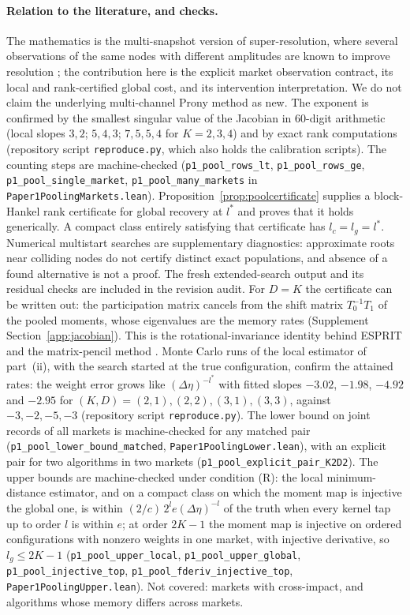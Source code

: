 \documentclass[12pt]{article}
\theoremstyle{definition}
\theoremstyle{remark}
\begin{document}
\paragraph{Relation to the literature, and checks.} The mathematics is the multi-snapshot version of super-resolution, where several observations of the same nodes with different amplitudes are known to improve resolution \citep{li2022}; the contribution here is the explicit market observation contract, its local and rank-certified global cost, and its intervention interpretation. We do not claim the underlying multi-channel Prony method as new. The exponent is confirmed by the smallest singular value of the Jacobian in 60-digit arithmetic (local slopes $3,2$; $5,4,3$; $7,5,5,4$ for $K=2,3,4$) and by exact rank computations (repository script \nolinkurl{reproduce.py}, which also holds the calibration scripts). The counting steps are machine-checked (\texttt{p1\_pool\_rows\_lt}, \texttt{p1\_pool\_rows\_ge}, \texttt{p1\_pool\_single\_market}, \texttt{p1\_pool\_many\_markets} in \nolinkurl{Paper1PoolingMarkets.lean}). Proposition~\ref{prop:poolcertificate} supplies a block-Hankel rank certificate for global recovery at $l^*$ and proves that it holds generically. A compact class entirely satisfying that certificate has $l_c=l_g=l^*$. Numerical multistart searches are supplementary diagnostics: approximate roots near colliding nodes do not certify distinct exact populations, and absence of a found alternative is not a proof. The fresh extended-search output and its residual checks are included in the revision audit. For $D=K$ the certificate can be written out: the participation matrix cancels from the shift matrix $T_0^{-1}T_1$ of the pooled moments, whose eigenvalues are the memory rates (Supplement Section~\ref{app:jacobian}). This is the rotational-invariance identity behind ESPRIT and the matrix-pencil method \citep{roy1989,huasarkar1990}. Monte Carlo runs of the local estimator of part~(ii), with the search started at the true configuration, confirm the attained rates: the weight error grows like $(\Delta\eta)^{-l^*}$ with fitted slopes $-3.02$, $-1.98$, $-4.92$ and $-2.95$ for $(K,D)=(2,1),(2,2),(3,1),(3,3)$, against $-3,-2,-5,-3$ (repository script \nolinkurl{reproduce.py}). The lower bound on joint records of all markets is machine-checked for any matched pair (\texttt{p1\_pool\_lower\_bound\_matched}, \nolinkurl{Paper1PoolingLower.lean}), with an explicit pair for two algorithms in two markets (\texttt{p1\_pool\_explicit\_pair\_K2D2}). The upper bounds are machine-checked under condition (R): the local minimum-distance estimator, and on a compact class on which the moment map is injective the global one, is within $(2/c)\,2^l e(\Delta\eta)^{-l}$ of the truth when every kernel tap up to order $l$ is within $e$; at order $2K-1$ the moment map is injective on ordered configurations with nonzero weights in one market, with injective derivative, so $l_g\le2K-1$ (\texttt{p1\_pool\_upper\_local}, \texttt{p1\_pool\_upper\_global}, \texttt{p1\_pool\_injective\_top}, \texttt{p1\_pool\_fderiv\_injective\_top}, \nolinkurl{Paper1PoolingUpper.lean}). Not covered: markets with cross-impact, and algorithms whose memory differs across markets.
\end{document}
